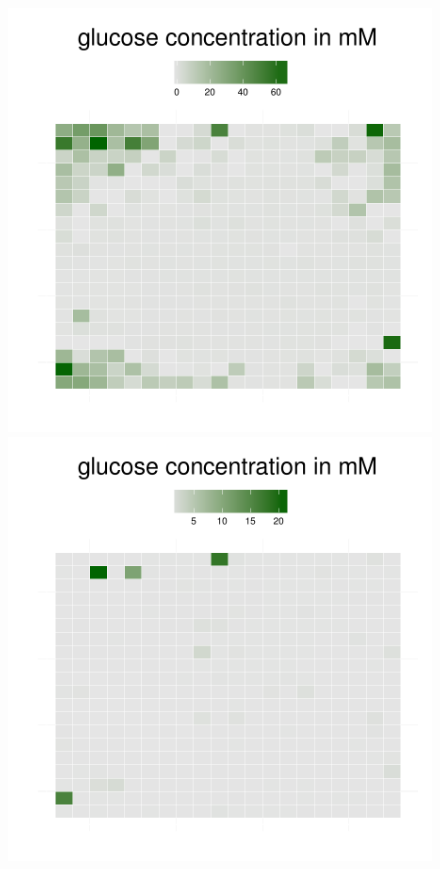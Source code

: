 \begin{figure}[h!]
{\begin{minipage}[t]{0.3\textwidth}
  \end{minipage}
  \begin{minipage}[t]{0.3\textwidth}
    \includegraphics[width=\textwidth]{../results/Bcoli_20x20_seed176_gluc35.pdf}
  \end{minipage}
  \begin{minipage}[t]{0.3\textwidth}
    \includegraphics[width=\textwidth]{../results/Bcoli_20x20_seed176_gluc50.pdf}

\end{minipage}}
\end{figure}
